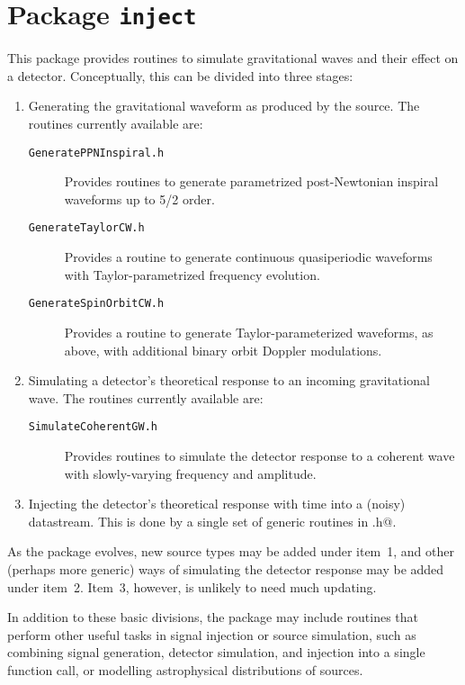 \chapter{Package \texttt{inject}}

This package provides routines to simulate gravitational waves and
their effect on a detector.  Conceptually, this can be divided into
three stages:
\begin{enumerate}
\item Generating the gravitational waveform as produced by the source.
The routines currently available are:
\begin{description}
\item[\texttt{GeneratePPNInspiral.h}] Provides routines to generate
parametrized post-Newtonian inspiral waveforms up to 5/2 order.
\item[\texttt{GenerateTaylorCW.h}] Provides a routine to generate
continuous quasiperiodic waveforms with Taylor-parametrized frequency
evolution.
\item[\texttt{GenerateSpinOrbitCW.h}] Provides a routine to generate
Taylor-parameterized waveforms, as above, with additional binary orbit
Doppler modulations.
\end{description}

\item Simulating a detector's theoretical response to an incoming
gravitational wave.  The routines currently available are:
\begin{description}
\item[\texttt{SimulateCoherentGW.h}] Provides routines to simulate the
detector response to a coherent wave with slowly-varying frequency and
amplitude.
\end{description}

\item Injecting the detector's theoretical response with time into a
(noisy) datastream.  This is done by a single set of generic routines
in \verb@Inject.h@.
\end{enumerate}

As the package evolves, new source types may be added under item~1,
and other (perhaps more generic) ways of simulating the detector
response may be added under item~2.  Item~3, however, is unlikely to
need much updating.

In addition to these basic divisions, the package may include routines
that perform other useful tasks in signal injection or source
simulation, such as combining signal generation, detector simulation,
and injection into a single function call, or modelling astrophysical
distributions of sources.

